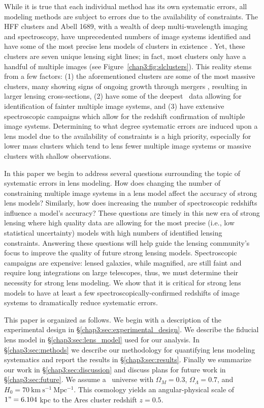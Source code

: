 While it is true that each individual method has its own systematic errors, all modeling methods are subject to errors due to the availability of constraints. The HFF clusters and Abell 1689, with a wealth of deep multi-wavelength imaging and spectroscopy, have unprecedented numbers of image systems identified and have some of the most precise lens models of clusters in existence \citep{Kawamata:2016nr,Treu:2016lr,Jauzac:2016dn,Diego:2015tg,Jauzac:2015xy,Jauzac:2014qd}. Yet, these clusters are seven unique lensing sight lines; in fact, most clusters only have a handful of multiple images (see Figure~\ref{chap3:fig:slclusters}). This reality stems from a few factors: (1) the aforementioned clusters are some of the most massive clusters, many showing signs of ongoing growth through mergers \citep{Jauzac:2015qf,Merten:2011fk}, resulting in larger lensing cross-sections, (2) have some of the deepest \hst\ data allowing for identification of fainter multiple image systems, and (3) have extensive spectroscopic campaigns which allow for the redshift confirmation of multiple image systems. Determining to what degree systematic errors are induced upon a lens model due to the availability of constraints is a high priority, especially for lower mass clusters which tend to lens fewer multiple image systems or massive clusters with shallow observations.

In this paper we begin to address several questions surrounding the topic of systematic errors in lens modeling. How does changing the number of constraining multiple image systems in a lens model affect the accuracy of strong lens models? Similarly, how does increasing the number of spectroscopic redshifts influence a model's accuracy? These questions are timely in this new era of strong lensing where high quality data are allowing for the most precise (i.e., low statistical uncertainty) models with high numbers of identified lensing constraints. Answering these questions will help guide the lensing community's focus to improve the quality of future strong lensing models. Spectroscopic campaigns are expensive: lensed galaxies, while magnified, are still faint and require long integrations on large telescopes, thus, we must determine their necessity for strong lens modeling. We show that it is critical for strong lens models to have at least a few spectroscopically-confirmed redshifts of image systems to dramatically reduce systematic errors.

This paper is organized as follows. We begin with a description of the experimental design in \S\ref{chap3:sec:experimental_design}. We describe the fiducial lens model in \S\ref{chap3:sec:lens_model} used for our analysis. In \S\ref{chap3:sec:methods} we describe our methodology for quantifying lens modeling systematics and report the results in \S\ref{chap3:sec:results}. Finally we summarize our work in \S\ref{chap3:sec:discussion} and discuss plans for future work in \S\ref{chap3:sec:future}. We assume a \LCDM\ universe with $\Omega_M=0.3$, $\Omega_\Lambda=0.7$, and $H_0=70\ \mathrm{km\ s^{-1}\ Mpc^{-1}}$. This cosmology yields an angular-physical scale of $1"=6.104$ kpc to the Ares cluster redshift $z=0.5$.


